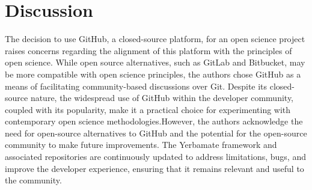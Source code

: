 \section{Discussion}

The decision to use GitHub, a closed-source platform, for an open science project raises concerns regarding the alignment of this platform with the principles of open science. While open source alternatives, such as GitLab and Bitbucket, may be more compatible with open science principles, the authors chose GitHub as a means of facilitating community-based discussions over Git. Despite its closed-source nature, the widespread use of GitHub within the developer community, coupled with its popularity, make it a practical choice for experimenting with contemporary open science methodologies.However, the authors acknowledge the need for open-source alternatives to GitHub and the potential for the open-source community to make future improvements. The Yerbamate framework and associated repositories are continuously updated to address limitations, bugs, and improve the developer experience, ensuring that it remains relevant and useful to the community.

